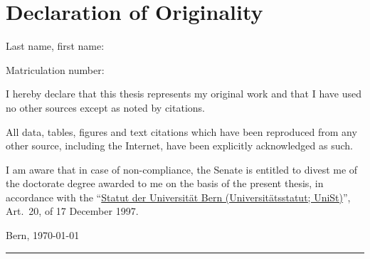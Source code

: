 \pagestyle{empty}
\hfill
\vfill
\section*{Declaration of Originality}
Last name, first name:\ \hrulefill\bigskip

\noindent Matriculation number:\ \hrulefill\bigskip

I hereby declare that this thesis represents my original work and that I have used no other sources except as noted by citations.

All data, tables, figures and text citations which have been reproduced from any other source, including the Internet, have been explicitly acknowledged as such.

I am aware that in case of non-compliance, the Senate is entitled to divest me of the doctorate degree awarded to me on the basis of the present thesis, in accordance with the
``\href{http://www.sta.be.ch/belex/d/4/436_111_2.html}{Statut der Universität Bern (Universitätsstatut; UniSt)}'', Art.\ 20, of 17 December 1997.\bigskip
 
\noindent Bern, \today \hfill \rule{0.5\linewidth}{0.01em}
